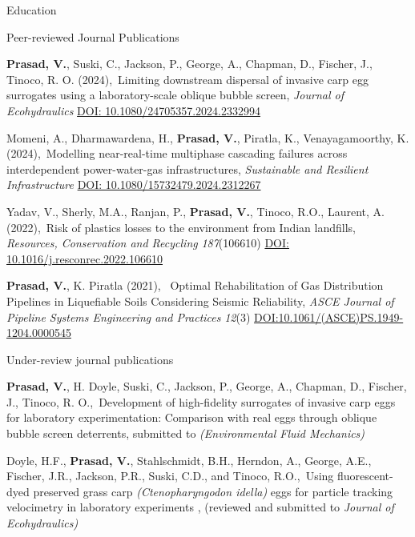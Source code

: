 \documentclass{resume} %
\begin{document}
\begin{rSection}{Education}
\begin{rSection}{Peer-reviewed Journal Publications}
\item \textbf{Prasad, V.}, Suski, C., Jackson, P., George, A., Chapman, D., Fischer, J., Tinoco, R. O. (2024),\ {Limiting downstream dispersal of invasive carp egg surrogates using a laboratory-scale oblique bubble screen, \textit{Journal of Ecohydraulics} \href{https://doi.org/10.1080/24705357.2024.2332994}{DOI: 10.1080/24705357.2024.2332994}} \\

\item Momeni, A., Dharmawardena, H., \textbf{Prasad, V.}, Piratla, K., Venayagamoorthy, K. (2024),\ {Modelling near-real-time multiphase cascading failures across interdependent power-water-gas infrastructures, \textit{Sustainable and Resilient Infrastructure} \href{https://www.tandfonline.com/doi/full/10.1080/15732479.2024.2312267}{DOI: 10.1080/15732479.2024.2312267}} \\

\item {Yadav, V., Sherly, M.A., Ranjan, P.,} \textbf {Prasad, V.}, Tinoco, R.O., Laurent, A. (2022),\ {Risk of plastics losses to the environment from Indian landfills, \textit{Resources, Conservation and Recycling} \textit{187}(106610) \href{https://www.sciencedirect.com/science/article/pii/S092134492200444X}{DOI: 10.1016/j.resconrec.2022.106610}} \\

\item \textbf{Prasad, V.}, K. Piratla (2021), \ {Optimal Rehabilitation of Gas Distribution Pipelines in Liquefiable Soils Considering Seismic Reliability, \textit{ASCE Journal of Pipeline Systems Engineering and Practices} \textit{12}(3) \href{https://ascelibrary.org/doi/abs/10.1061/(ASCE)PS.1949-1204.0000545}{DOI:10.1061/(ASCE)PS.1949-1204.0000545}} 
 
\end{rSection}

\begin{rSection} {Under-review journal publications} \itemsep -2pt

\item \textbf{Prasad, V.}, H. Doyle, Suski, C., Jackson, P., George, A., Chapman, D., Fischer, J., Tinoco, R. O.,\ {Development of high-fidelity surrogates of invasive carp eggs for laboratory experimentation: Comparison with real eggs through oblique bubble screen deterrents}, submitted to \textit{(Environmental Fluid Mechanics)} \\

\item Doyle, H.F., \textbf{Prasad, V.}, Stahlschmidt, B.H., Herndon, A., George, A.E., Fischer, J.R., Jackson, P.R., Suski, C.D., and Tinoco, R.O.,\ {Using fluorescent-dyed preserved grass carp \textit{(Ctenopharyngodon idella)} eggs for particle tracking velocimetry in laboratory experiments }, (reviewed and submitted to \textit{Journal of Ecohydraulics)} \\
\end{rSection}


\end{rSection}
\end{document}
